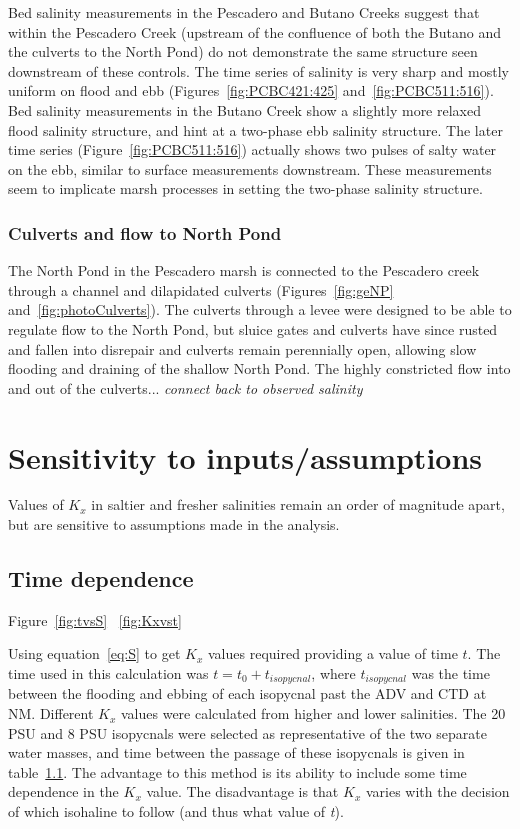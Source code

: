 Bed salinity measurements in the Pescadero and Butano Creeks suggest that within the Pescadero Creek (upstream of the confluence of both the Butano and the culverts to the North Pond) do not demonstrate the same structure seen downstream of these controls. The time series of salinity is very sharp and mostly uniform on flood and ebb (Figures~\ref{fig:PCBC421:425} and~\ref{fig:PCBC511:516}). Bed salinity measurements in the Butano Creek show a slightly more relaxed flood salinity structure, and hint at a two-phase ebb salinity structure. The later time series (Figure~\ref{fig:PCBC511:516}) actually shows two pulses of salty water on the ebb, similar to surface measurements downstream. These measurements seem to implicate marsh processes in setting the two-phase salinity structure.

\subsubsection{Culverts and flow to North Pond}
The North Pond in the Pescadero marsh is connected to the Pescadero creek through a channel and dilapidated culverts (Figures~\ref{fig:geNP} and~\ref{fig:photoCulverts}). The culverts through a levee were designed to be able to regulate flow to the North Pond, but sluice gates and culverts have since rusted and fallen into disrepair and culverts remain perennially open, allowing slow flooding and draining of the shallow North Pond. The highly constricted flow into and out of the culverts... \emph{connect back to observed salinity}

\section{Sensitivity to inputs/assumptions} \label{sec:Sensitivity}

Values of $K_x$ in saltier and fresher salinities remain an order of magnitude apart, but are sensitive to assumptions made in the analysis.

\subsection{Time dependence}

Figure~\ref{fig:tvsS} ~\ref{fig:Kxvst}

Using equation~\ref{eq:S} to get $K_x$ values required providing a value of time $t$. The time used in this calculation was $t=t_0 + t_{isopycnal}$, where $t_{isopycnal}$ was the time between the flooding and ebbing of each isopycnal past the ADV and CTD at NM. Different $K_x$ values were calculated from higher and lower salinities. The 20 PSU and 8 PSU isopycnals were selected as representative of the two separate water masses, and time between the passage of these isopycnals is given in table~\ref{}. The advantage to this method is its ability to include some time dependence in the $K_x$ value. The disadvantage is that $K_x$ varies with the decision of which isohaline to follow (and thus what value of \emph{t}). 


